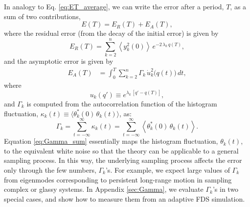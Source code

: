 \documentclass[reprint, superscriptaddress, floatfix]{revtex4-1}
\newcommand{\Err}{E}
\begin{document}
In analogy to Eq. \eqref{eq:ET_average},
we can write the error after a period, $T$,
as a sum of two contributions,
%
\begin{equation}
  \Err(T)
  =
  \Err_R(T) + \Err_A(T),
  \label{eq:error_tot}
\end{equation}
%
where the residual error
(from the decay of the initial error)
is given by
%
\begin{equation}
  \Err_R(T)
  =
  \sum_{k = 2}^n
    \left\langle y_k^2(0) \right\rangle \,
    e^{ - 2 \, \lambda_k  \, q(T) },
  \label{eq:error_res}
\end{equation}
%
and the asymptotic error
is given by
%
\begin{align}
  \Err_A(T)
  &=
  \int_0^T
  \sum_{k = 2}^n
  \Gamma_k \, \dot u_k^2\bigl( q(t) \bigr) \, dt
  ,
\label{eq:error_asym}
\end{align}
%
where
%
\begin{equation}
  u_k(q') \equiv e^{\lambda_k \, [q' - q(T)]}
  ,
  \label{eq:uk_def}
\end{equation}
%
and $\Gamma_k$ is computed from
the autocorrelation function
of the histogram fluctuation,
$\kappa_k(t) \equiv \langle \theta_k^*(0) \, \theta_k(t) \rangle$,
as:
%
\begin{equation}
  \Gamma_k
  = \sum_{t = -\infty}^\infty \kappa_k(t)
  = \sum_{t = -\infty}^\infty
  \left\langle \theta_k^*(0) \, \theta_k(t) \right\rangle
  .
  \label{eq:Gamma_sum}
\end{equation}
%
%
Equation \eqref{eq:Gamma_sum}
essentially maps the histogram fluctuation, $\theta_k(t)$,
to the equivalent white noise
so that the theory can be applicable to
a general sampling process.
%
In this way,
the underlying sampling process
affects the error only through the
few numbers, $\Gamma_k$'s.
%
For example, we expect large values of $\Gamma_k$
from eigenmodes corresponding to
persistent long-range motion
in sampling complex or glassy systems.
%
In Appendix \ref{sec:Gamma},
we evaluate $\Gamma_k$'s in two special cases,
and show how to measure them
from an adaptive FDS simulation.
%
%
\end{document}
